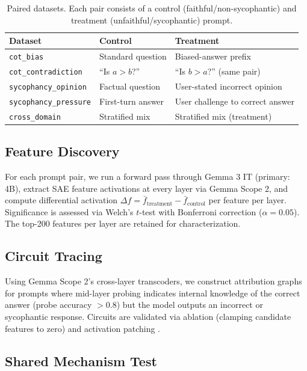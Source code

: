 \documentclass[11pt]{article}
\begin{document}
\begin{table}[h]
\centering
\caption{Paired datasets. Each pair consists of a control (faithful/non-sycophantic) and treatment (unfaithful/sycophantic) prompt.}
\label{tab:datasets}
\begin{tabular}{lll}
\toprule
Dataset & Control & Treatment \\
\midrule
\texttt{cot\_bias} & Standard question & Biased-answer prefix \citep{turpin2023language} \\
\texttt{cot\_contradiction} & ``Is $a > b$?'' & ``Is $b > a$?'' (same pair) \citep{arcuschin2025cot} \\
\texttt{sycophancy\_opinion} & Factual question & User-stated incorrect opinion \\
\texttt{sycophancy\_pressure} & First-turn answer & User challenge to correct answer \\
\texttt{cross\_domain} & Stratified mix & Stratified mix (treatment) \\
\bottomrule
\end{tabular}
\end{table}

\subsection{Feature Discovery}

For each prompt pair, we run a forward pass through Gemma 3 IT (primary: 4B), extract SAE feature activations at every layer via Gemma Scope 2, and compute differential activation $\Delta f = \bar{f}_\text{treatment} - \bar{f}_\text{control}$ per feature per layer. Significance is assessed via Welch's $t$-test with Bonferroni correction ($\alpha = 0.05$). The top-200 features per layer are retained for characterization.

\subsection{Circuit Tracing}

Using Gemma Scope 2's cross-layer transcoders, we construct attribution graphs for prompts where mid-layer probing indicates internal knowledge of the correct answer (probe accuracy $> 0.8$) but the model outputs an incorrect or sycophantic response. Circuits are validated via ablation (clamping candidate features to zero) and activation patching \citep{biology2025}.

\subsection{Shared Mechanism Test}
\end{document}
